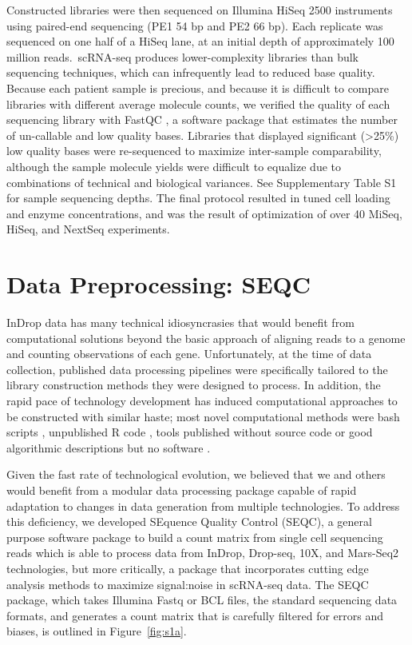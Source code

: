 Constructed libraries were then sequenced on Illumina HiSeq 2500 instruments using paired-end sequencing (PE1 54 bp and PE2 66 bp). 
Each replicate was sequenced on one half of a HiSeq lane, at an initial depth of approximately 100 million reads.\ 
scRNA-seq produces lower-complexity libraries than bulk sequencing techniques, which can infrequently lead to reduced base quality. Because each patient sample is precious, and because it is difficult to compare libraries with different average molecule counts, we verified the quality of each sequencing library with FastQC \citep{Andrews2010}, a software package that estimates the number of un-callable and low quality bases.
Libraries that displayed significant (\textgreater{}25\%) low quality bases were re-sequenced to maximize inter-sample comparability, although the sample molecule yields were difficult to equalize due to combinations of technical and biological variances. 
See Supplementary Table S1 for sample sequencing depths.  
The final protocol resulted in tuned cell loading and enzyme concentrations, and was the result of optimization of over 40 MiSeq, HiSeq, and NextSeq experiments.

\section{Data Preprocessing: SEQC}

InDrop data has many technical idiosyncrasies that would benefit from computational solutions beyond the basic approach of aligning reads to a genome and counting observations of each gene. 
Unfortunately, at the time of data collection, published data processing pipelines were specifically tailored to the library construction methods they were designed to process. 
In addition, the rapid pace of technology development has induced computational approaches to be constructed with similar haste; most novel computational methods were bash scripts \citep{Shalek2013,Shalek2014}, unpublished R code \citep{Jaitin2014}, tools published without source code \citep{Macosko2015} or good algorithmic descriptions but no software \citep{Klein2015}. 

Given the fast rate of technological evolution, we believed that we and others would benefit from a modular data processing package capable of rapid adaptation to changes in data generation from multiple technologies.
To address this deficiency, we developed SEquence Quality Control (SEQC), a general purpose software package to build a count matrix from single cell sequencing reads which is able to process data from InDrop, Drop-seq, 10X, and Mars-Seq2 technologies, but more critically, a package that incorporates cutting edge analysis methods to maximize signal:noise in scRNA-seq data. 
The SEQC package, which takes Illumina Fastq or BCL files, the standard sequencing data formats, and generates a count matrix that is carefully filtered for errors and biases, is outlined in Figure~\ref{fig:s1a}. 

